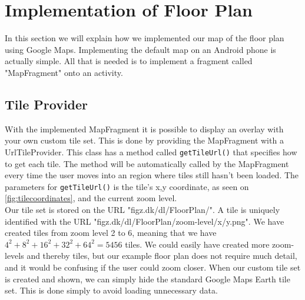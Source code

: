 \section{Implementation of Floor Plan}
In this section we will explain how we implemented our map of the floor plan using Google Maps. Implementing the default map on an Android phone is actually simple. All that is needed is to implement a fragment called "MapFragment" onto an activity.
\subsection*{Tile Provider}
With the implemented MapFragment it is possible to display an overlay with your own custom tile set. This is done by providing the MapFragment with a UrlTileProvider\citep{tilecoordinates}. This class has a method called \lstinline|getTileUrl()| that specifies how to get each tile. The method will be automatically called by the MapFragment every time the user moves into an region where tiles still hasn't been loaded. The parameters for \lstinline|getTileUrl()| is the tile's x,y coordinate, as seen on \autoref{fig:tilecoordinates}, and the current zoom level.\\
Our tile set is stored on the URL "figz.dk/dl/FloorPlan/". A tile is uniquely identified with the URL "figz.dk/dl/FloorPlan/zoom-level/x/y.png". We have created tiles from zoom level 2 to 6, meaning that we have $4^2+8^2+16^2+32^2+64^2 = 5456$ tiles. We could easily have created more zoom-levels and thereby tiles, but our example floor plan does not require much detail, and it would be confusing if the user could zoom closer. When our custom tile set is created and shown, we can simply hide the standard Google Maps Earth tile set. This is done simply to avoid loading unnecessary data.
